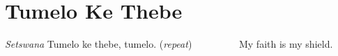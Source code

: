 \starttocol
\chapter{Tumelo Ke Thebe}
\nexttocol
\hfill{\it Setswana}
\stoptocol
\starttocol
\startlines
T{\sc umelo} ke thebe, tumelo.    \hfill     ({\it repeat})~~~~~~~~~\hfill
\stoplines
\nexttocol
My faith is my shield.
\stoptocol
